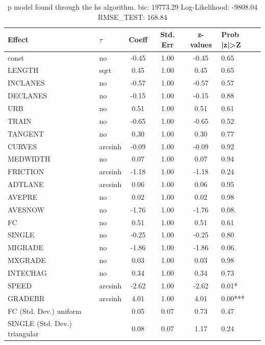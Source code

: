 \begin{table}
	\caption{p model found through the hs algorithm. bic: 19773.29 Log-Likelihood: -9808.04 RMSE_TEST: 168.84}
	\begin{center}
		\begin{tabular}{|l|l|c|c|c|l|}
			\hline
			Effect & $\tau$ & Coeff & Std. Err & z-values & Prob |z|>Z \\
			\hline
			const & no & -0.45 & 1.00 & -0.45 & 0.65 \\
			\hline
			LENGTH & sqrt & 0.45 & 1.00 & 0.45 & 0.65 \\
			\hline
			INCLANES & no & -0.57 & 1.00 & -0.57 & 0.57 \\
			\hline
			DECLANES & no & -0.15 & 1.00 & -0.15 & 0.88 \\
			\hline
			URB & no & 0.51 & 1.00 & 0.51 & 0.61 \\
			\hline
			TRAIN & no & -0.65 & 1.00 & -0.65 & 0.52 \\
			\hline
			TANGENT & no & 0.30 & 1.00 & 0.30 & 0.77 \\
			\hline
			CURVES & arcsinh & -0.09 & 1.00 & -0.09 & 0.92 \\
			\hline
			MEDWIDTH & no & 0.07 & 1.00 & 0.07 & 0.94 \\
			\hline
			FRICTION & arcsinh & -1.18 & 1.00 & -1.18 & 0.24 \\
			\hline
			ADTLANE & arcsinh & 0.06 & 1.00 & 0.06 & 0.95 \\
			\hline
			AVEPRE & no & 0.02 & 1.00 & 0.02 & 0.98 \\
			\hline
			AVESNOW & no & -1.76 & 1.00 & -1.76 & 0.08. \\
			\hline
			FC & no & 0.51 & 1.00 & 0.51 & 0.61 \\
			\hline
			SINGLE & no & -0.25 & 1.00 & -0.25 & 0.80 \\
			\hline
			MIGRADE & no & -1.86 & 1.00 & -1.86 & 0.06. \\
			\hline
			MXGRADE & no & 0.03 & 1.00 & 0.03 & 0.98 \\
			\hline
			INTECHAG & no & 0.34 & 1.00 & 0.34 & 0.73 \\
			\hline
			SPEED & arcsinh & -2.62 & 1.00 & -2.62 & 0.01* \\
			\hline
			GRADEBR & arcsinh & 4.01 & 1.00 & 4.01 & 0.00*** \\
			\hline
			FC (Std. Dev.) uniform &  & 0.05 & 0.07 & 0.73 & 0.47 \\
			\hline
			SINGLE (Std. Dev.) triangular &  & 0.08 & 0.07 & 1.17 & 0.24 \\

\end{tabular}
\end{center}
\end{table}
